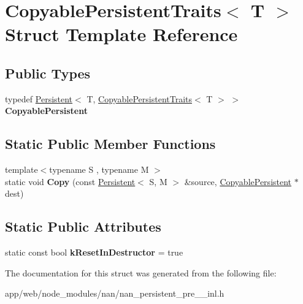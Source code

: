 \hypertarget{struct_copyable_persistent_traits}{}\section{Copyable\+Persistent\+Traits$<$ T $>$ Struct Template Reference}
\label{struct_copyable_persistent_traits}
\subsection*{Public Types}
\begin{DoxyCompactItemize}
\item 
\mbox{\label{struct_copyable_persistent_traits_adf75f293ce0c3d9feab9feb7ba9e9b02}} 
typedef \hyperlink{class_persistent}{Persistent}$<$ T, \hyperlink{struct_copyable_persistent_traits}{Copyable\+Persistent\+Traits}$<$ T $>$ $>$ {\bfseries Copyable\+Persistent}
\end{DoxyCompactItemize}
\subsection*{Static Public Member Functions}
\begin{DoxyCompactItemize}
\item 
\mbox{\label{struct_copyable_persistent_traits_aa1a0b12d1ba0dff30cc6e7208740b3b5}} 
{\footnotesize template$<$typename S , typename M $>$ }\\static void {\bfseries Copy} (const \hyperlink{class_persistent}{Persistent}$<$ S, M $>$ \&source, \hyperlink{class_persistent}{Copyable\+Persistent} $\ast$dest)
\end{DoxyCompactItemize}
\subsection*{Static Public Attributes}
\begin{DoxyCompactItemize}
\item 
\mbox{\label{struct_copyable_persistent_traits_a677fab5f525a604724b3aa1fe51be784}} 
static const bool {\bfseries k\+Reset\+In\+Destructor} = true
\end{DoxyCompactItemize}


The documentation for this struct was generated from the following file\+:\begin{DoxyCompactItemize}
\item 
app/web/node\+\_\+modules/nan/nan\+\_\+persistent\+\_\+pre\+\_\+\_\+inl.\+h\end{DoxyCompactItemize}
